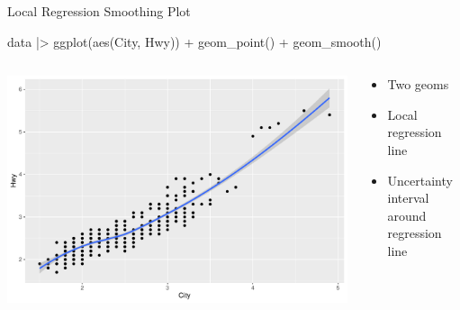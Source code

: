 \documentclass[ignorenonframetext,xcolor=x11names]{beamer}
\begin{document}
\begin{frame}[fragile]{Local Regression Smoothing Plot}
\footnotesize
\begin{Rcode}
data |>
  ggplot(aes(City, Hwy)) +
    geom_point() +
    geom_smooth()
\end{Rcode}
\begin{columns}
\begin{column}{.75\textwidth}
  \includegraphics[width=\textwidth]{fuel.linesSmooth.pdf}
\end{column}
\begin{column}{.35\textwidth}
  \begin{itemize}
     \item Two geoms
     \item Local regression line
     \item Uncertainty interval around regression line
   \end{itemize}
\end{column}
\end{columns}
\end{frame}

\end{document}
